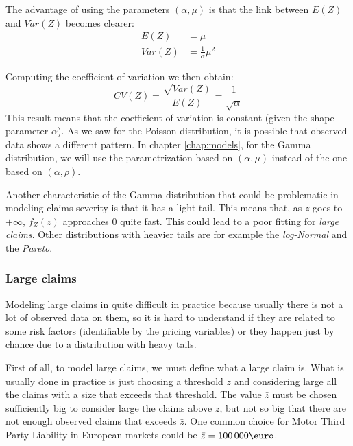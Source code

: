 \documentclass[a4paper, twoside, openright, 12pt]{report}
\theoremstyle{definition}
\theoremstyle{definition}
\theoremstyle{definition}
\theoremstyle{remark}
\begin{document}
The advantage of using the parameters \((\alpha, \mu)\) is that the link between \(E(Z)\) and \(Var(Z)\) becomes clearer:
\begin{align*}
E(Z)   & = \mu \\
Var(Z) & = \frac{1}{\alpha}\mu^2
\end{align*}

Computing the coefficient of variation we then obtain:
\[CV(Z) = \frac{\sqrt{Var(Z)}}{E(Z)} = \frac{1}{\sqrt{\alpha}}\]
This result means that the coefficient of variation is constant (given the shape parameter \(\alpha\)). As we saw for the Poisson distribution, it is possible that observed data shows a different pattern. In chapter \ref{chap:models}, for the Gamma distribution, we will use the parametrization based on \((\alpha, \mu)\) instead of the one based on \((\alpha, \rho)\).

Another characteristic of the Gamma distribution that could be problematic in modeling claims severity is that it has a light tail. This means that, as \(z\) goes to \(+\infty\), \(f_Z(z)\) approaches \(0\) quite fast. This could lead to a poor fitting for \emph{large claims}. Other distributions with heavier tails are for example the \emph{log-Normal} and the \emph{Pareto}.

\hypertarget{chap:large-claims}{%
\subsubsection{Large claims}\label{chap:large-claims}}

Modeling large claims in quite difficult in practice because usually there is not a lot of observed data on them, so it is hard to understand if they are related to some risk factors (identifiable by the pricing variables) or they happen just by chance due to a distribution with heavy tails.

First of all, to model large claims, we must define what a large claim is. What is usually done in practice is just choosing a threshold \(\bar{z}\) and considering large all the claims with a size that exceeds that threshold. The value \(\bar{z}\) must be chosen sufficiently big to consider large the claims above \(\bar{z}\), but not so big that there are not enough observed claims that exceeds \(\bar{z}\). One common choice for Motor Third Party Liability in European markets could be \(\bar{z} = 100\, 000 \text{\euro}\).
\end{document}
